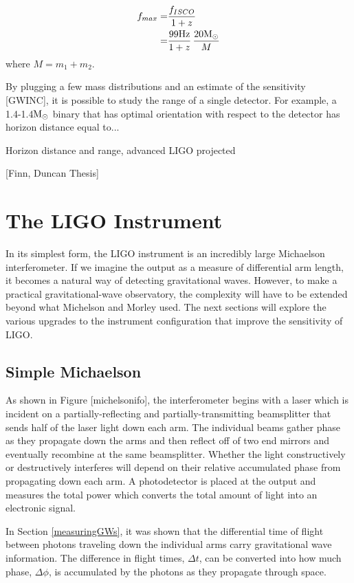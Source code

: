 	\begin{equation}
	\begin{aligned}
	f_{max}	=&  \frac{f_{ISCO}}{1+z} \\
			=&	\frac{99 \text{Hz}}{1+z} \, \frac{20 \textup{M}_\odot}{M}
	\end{aligned}
	\end{equation}
	where $M=m_1+m_2$.
	
	
	By plugging a few mass distributions and an estimate of the sensitivity [GWINC], it is possible to study the range of a single detector.  For example, a 1.4-1.4$\textup{M}_\odot$ binary that has optimal orientation with respect to the detector has horizon distance equal to...
	
	Horizon distance and range, advanced LIGO projected
	
	[Finn, Duncan Thesis]
	\cite{Saulson}
	
	\section{The LIGO Instrument}\label{LIGOInstrument}
	In its simplest form, the LIGO instrument is an incredibly large Michaelson interferometer.  
	If we imagine the output as a measure of differential arm length, it becomes a natural way of detecting gravitational waves. 
	However, to make a practical gravitational-wave observatory, the complexity will have to be extended beyond what Michelson and Morley used.  
	The next sections will explore the various upgrades to the instrument configuration that improve the sensitivity of LIGO.
	
		\subsection{Simple Michaelson}\label{michelson}
		As shown in Figure [michelsonifo], the interferometer begins with a laser which is incident on a partially-reflecting and partially-transmitting beamsplitter that sends half of the laser light down each arm.  The individual beams gather phase as they propagate down the arms and then reflect off of two end mirrors and eventually recombine at the same beamsplitter.  Whether the light constructively or destructively interferes will depend on their relative accumulated phase from propagating down each arm. A photodetector is placed at the output and measures the total power which converts the total amount of light into an electronic signal.
		
		In Section \ref{measuringGWs}, it was shown that the differential time of flight between photons traveling down the individual arms carry gravitational wave information.  
		The difference in flight times, $\Delta t$, can be converted into how much phase, $\Delta \phi$, is accumulated by the photons as they propagate through space.  
		
